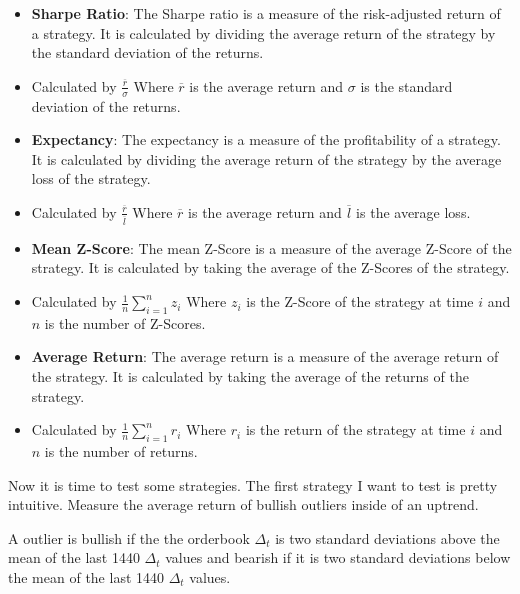 \documentclass[12pt]{article}
\begin{document}
\begin{itemize}
  \item \textbf{Sharpe Ratio}: The Sharpe ratio is a measure of the risk-adjusted return of a strategy. It is calculated by dividing the average return of the strategy by the standard deviation of the returns.
  \item Calculated by $\frac{\overline{r}}{\sigma}$ Where $\overline{r}$ is the average return and $\sigma$ is the standard deviation of the returns.
  \item \textbf{Expectancy}: The expectancy is a measure of the profitability of a strategy. It is calculated by dividing the average return of the strategy by the average loss of the strategy.
  \item Calculated by $\frac{\overline{r}}{\overline{l}}$ Where $\overline{r}$ is the average return and $\overline{l}$ is the average loss.
  \item \textbf{Mean Z-Score}: The mean Z-Score is a measure of the average Z-Score of the strategy. It is calculated by taking the average of the Z-Scores of the strategy.
  \item Calculated by $\frac{1}{n}\sum_{i=1}^{n} z_i$ Where $z_i$ is the Z-Score of the strategy at time $i$ and $n$ is the number of Z-Scores.
  \item \textbf{Average Return}: The average return is a measure of the average return of the strategy. It is calculated by taking the average of the returns of the strategy.
  \item Calculated by $\frac{1}{n}\sum_{i=1}^{n} r_i$ Where $r_i$ is the return of the strategy at time $i$ and $n$ is the number of returns.



\end{itemize}



Now it is time to test some strategies. The first strategy I want to test is pretty intuitive. Measure the average return of bullish outliers inside of an uptrend.

\begin{list}{label}{spacing}
  \item A outlier is bullish if the the orderbook $\Delta_t$ is two standard deviations above the mean of the last 1440 $\Delta_t$ values and bearish if it is two standard deviations below the mean of the last 1440 $\Delta_t$ values.

\end{list}
\end{document}

